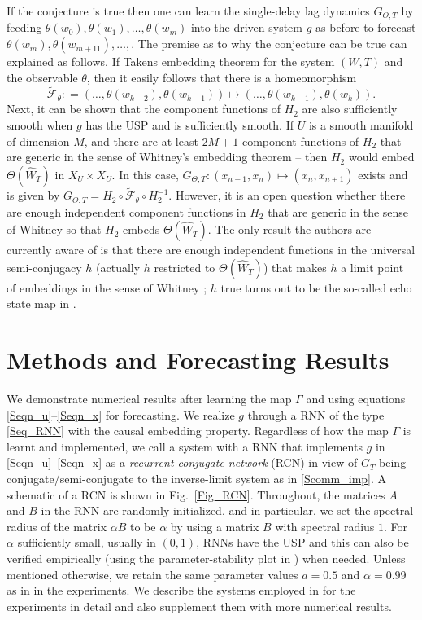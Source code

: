 \documentclass[12 pt]{article}
\begin{document}
If the conjecture is true then one  can learn the single-delay lag dynamics $G_{\Theta,T}$ 
 by feeding  $\theta(w_{0}),\theta(w_{1}),\ldots,\theta(w_{m})$ into the driven system $g$ as before to forecast $\theta(w_{m}),\theta(w_{m+11}),\ldots,$.  The premise as to why the conjecture can be true can explained as follows. If Takens embedding theorem for  the system $(W,T)$ and the observable $\theta$, then it easily follows that there is a homeomorphism $$\widetilde{\mathcal{F}}_{\theta} : = (\ldots, \theta(w_{k-2}),\theta(w_{k-1})) \mapsto (\ldots, \theta(w_{k-1}),\theta(w_{k})).$$ Next, it can be shown that the component functions of $H_2$ are also sufficiently smooth \cite[Theorem III.1]{grigoryeva2020chaos} when $g$ has the USP and is sufficiently smooth.  If $U$ is a smooth manifold of dimension $M$, and there are at least $2M+1$ component functions of $H_2$ that are generic in the sense of Whitney's embedding theorem --  then  $H_2$ would embed $\Theta(\widehat{W}_T)$ in $X_U \times X_U$. In this case, $G_{\Theta,T} : (x_{n-1}, x_n) \mapsto (x_{n}, x_{n+1})$ exists and is given by $G_{\Theta,T} = H_2 \circ \widetilde{\mathcal{F}}_{\theta} \circ H_2^{-1}$. However, it is an open question whether there are enough independent component functions in $H_2$ that are generic in the sense of Whitney so that $H_2$ embeds $\Theta(\widehat{W}_T)$.  The only result the authors are currently aware of is that there are enough independent functions in  the universal semi-conjugacy $h$ (actually $h$ restricted to $\Theta(\widehat{W}_T)$)  that makes $h$ a limit point of embeddings in the sense of Whitney \cite[Corollary 2.3.2]{hart2019embedding}; $h$ true turns out to be the so-called echo state map in \cite{hart2019embedding}. 
 


\section{Methods and Forecasting Results} \label{Sec_Methods}


We demonstrate numerical results after learning the map $\Gamma$ and using equations \eqref{Seqn_u}--\eqref{Seqn_x} for forecasting. 
We realize $g$ through a RNN of the type \eqref{Seq_RNN} with the causal embedding property. Regardless of how the map $\Gamma$ is learnt and implemented, we call a system with a RNN that implements $g$ in \eqref{Seqn_u}--\eqref{Seqn_x} as a \emph{recurrent conjugate network} (RCN) in view of $G_T$ being conjugate/semi-conjugate to the inverse-limit system as in \eqref{Scomm_imp}. A schematic of a RCN is shown in Fig.~\ref{Fig_RCN}. Throughout, the matrices $A$ and $B$ in the RNN are randomly initialized, and in particular, we set the spectral radius of the matrix $\alpha B$ to be $\alpha$ by using a matrix $B$ with spectral radius  $1$. For $\alpha$ sufficiently small, usually in $(0,1)$, RNNs have the USP and this can also be verified empirically (using the parameter-stability plot in \cite{manjunath2020stability}) when needed. Unless mentioned otherwise, we retain the same parameter values  $a=0.5$ and $\alpha=0.99$ as in \cite{Main_article} in the experiments. We describe the systems employed in \cite{Main_article} for the experiments  in detail and also supplement them with more numerical results. 
\end{document}
